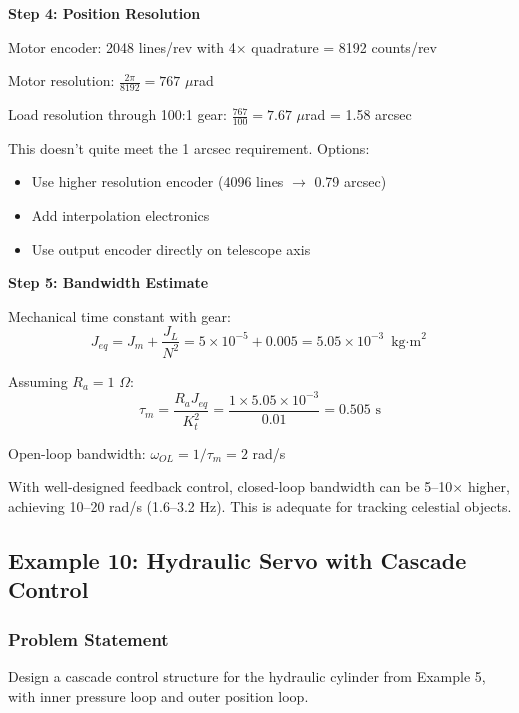 \textbf{Step 4: Position Resolution}

Motor encoder: 2048 lines/rev with 4$\times$ quadrature = 8192 counts/rev

Motor resolution: $\frac{2\pi}{8192} = 767$ $\mu$rad

Load resolution through 100:1 gear: $\frac{767}{100} = 7.67$ $\mu$rad = 1.58 arcsec

This doesn't quite meet the 1 arcsec requirement. Options:
\begin{itemize}
    \item Use higher resolution encoder (4096 lines $\rightarrow$ 0.79 arcsec)
    \item Add interpolation electronics
    \item Use output encoder directly on telescope axis
\end{itemize}

\textbf{Step 5: Bandwidth Estimate}

Mechanical time constant with gear:
\begin{equation}
    J_{eq} = J_m + \frac{J_L}{N^2} = 5 \times 10^{-5} + 0.005 = 5.05 \times 10^{-3} \text{ kg$\cdot$m}^2
\end{equation}

Assuming $R_a = 1$ $\Omega$:
\begin{equation}
    \tau_m = \frac{R_a J_{eq}}{K_t^2} = \frac{1 \times 5.05 \times 10^{-3}}{0.01} = 0.505 \text{ s}
\end{equation}

Open-loop bandwidth: $\omega_{OL} = 1/\tau_m = 2$ rad/s

With well-designed feedback control, closed-loop bandwidth can be 5--10$\times$ higher, achieving 10--20 rad/s (1.6--3.2 Hz). This is adequate for tracking celestial objects.

\subsection{Example 10: Hydraulic Servo with Cascade Control}

\subsubsection{Problem Statement}

Design a cascade control structure for the hydraulic cylinder from Example 5, with inner pressure loop and outer position loop.


